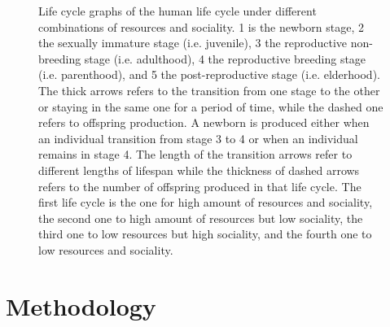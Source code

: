 \documentclass{article}
\begin{document}
\begin{figure}[H]
\caption{Life cycle graphs of the human life cycle under different combinations of resources and sociality. 1 is the newborn stage, 2 the sexually immature stage (i.e. juvenile), 3 the reproductive non-breeding stage (i.e. adulthood), 4 the reproductive breeding stage (i.e. parenthood), and 5 the post-reproductive stage (i.e. elderhood). The thick arrows refers to the transition from one stage to the other or staying in the same one for a period of time, while the dashed one refers to offspring production. A newborn is produced either when an individual transition from stage 3 to 4 or when an individual remains in stage 4. The length of the transition arrows refer to different lengths of lifespan while the thickness of dashed arrows refers to the number of offspring produced in that life cycle. The first life cycle is the one for high amount of resources and sociality, the second one to high amount of resources but low sociality, the third one to low resources but high sociality, and the fourth one to low resources and sociality.}
    \label{fig:2}
\end{figure}


\section{Methodology}
\end{document}
